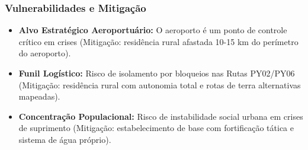 \subsubsection{Vulnerabilidades e
Mitigação}

\begin{itemize}
\tightlist
\item
  \textbf{Alvo Estratégico Aeroportuário:} O aeroporto é um ponto de
  controle crítico em crises (Mitigação: residência rural afastada 10-15
  km do perímetro do aeroporto).
\item
  \textbf{Funil Logístico:} Risco de isolamento por bloqueios nas Rutas
  PY02/\allowbreak PY06 (Mitigação: residência rural com autonomia total e rotas de
  terra alternativas mapeadas).
\item
  \textbf{Concentração Populacional:} Risco de instabilidade social
  urbana em crises de suprimento (Mitigação: estabelecimento de base com
  fortificação tática e sistema de água próprio).
\end{itemize}

